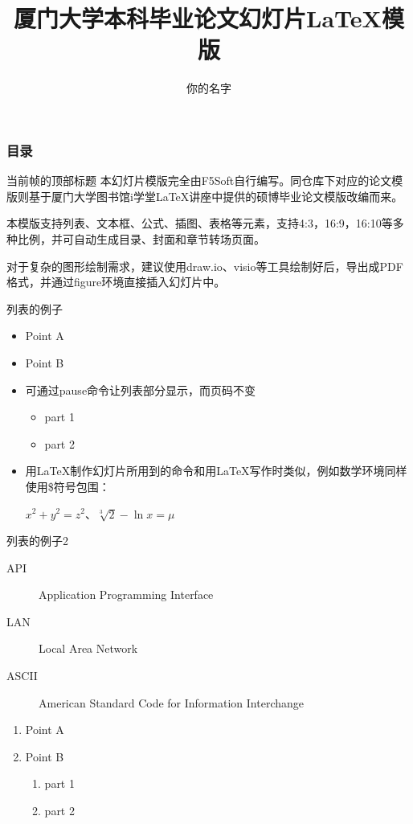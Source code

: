 \documentclass[aspectratio=169]{xmu-slide}
\title{厦门大学本科毕业论文幻灯片LaTeX模版}
\author{你的名字}
\begin{document}
\maketitle

\begin{frame}
    \frametitle{目录}
    \tableofcontents
\end{frame}


\begin{frame}{当前帧的顶部标题}
    \color{red}本幻灯片模版完全由F5Soft自行编写。\color{black}同仓库下对应的论文模版则基于厦门大学图书馆i学堂LaTeX讲座中提供的硕博毕业论文模版改编而来。\par
    本模版支持列表、文本框、公式、插图、表格等元素，支持4:3，16:9，16:10等多种比例，并可自动生成目录、封面和章节转场页面。\par
    \color{red}对于复杂的图形绘制需求，建议使用draw.io、visio等工具绘制好后，导出成PDF格式，并通过figure环境直接插入幻灯片中。
\end{frame}

\begin{frame}{列表的例子}
    \begin{itemize}
        \item Point A
        \item Point B
        \pause
        \item 可通过pause命令让列表部分显示，而页码不变
              \begin{itemize}
                  \item part 1
                  \item part 2
              \end{itemize}
        \pause
        \item 用LaTeX制作幻灯片所用到的命令和用LaTeX写作时类似，例如数学环境同样使用\$符号包围： \par
              $x^2+y^2=z^2$、$\sqrt[3]{2}-\ln x=\mu$
    \end{itemize}
\end{frame}

\begin{frame}{列表的例子2}
    \begin{description}
        \item[API] Application Programming Interface
        \item[LAN] Local Area Network
        \item[ASCII] American Standard Code for Information Interchange
    \end{description}
    \begin{enumerate}[I]
        \item Point A
        \item Point B
              \begin{enumerate}[i]
                  \item part 1
                  \item part 2
              \end{enumerate}
    \end{enumerate}
\end{frame}
\end{document}
